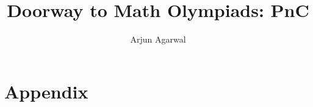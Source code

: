 \documentclass{maaprb}
\title{Doorway to Math Olympiads: PnC}
\author{Arjun Agarwal}
\begin{document}
\frontmatter
\maketitle
\mainmatter

\backmatter
\part{Appendix}

\clearpage
\end{document}
